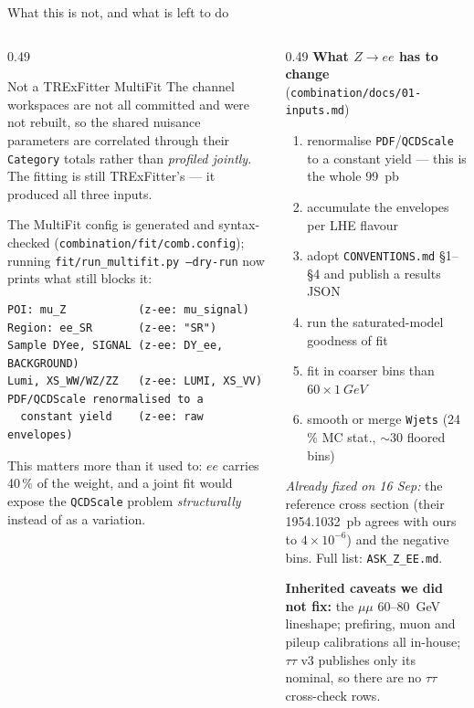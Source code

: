 \documentclass[aspectratio=169,9pt,t]{beamer}
\newcommand{\ee}{\ensuremath{ee}}
\newcommand{\src}[1]{{\scriptsize\color{gray}\texttt{#1}}}
\begin{document}
\begin{frame}[fragile]{What this is not, and what is left to do}
\begin{columns}[T]
\begin{column}{0.49\textwidth}\small
\begin{alertblock}{Not a TRExFitter MultiFit}
The channel workspaces are not all committed and were not rebuilt, so the shared nuisance
parameters are correlated through their \texttt{Category} totals rather than \emph{profiled
jointly}. The fitting is still TRExFitter's --- it produced all three inputs.
\end{alertblock}
The MultiFit config is generated and syntax-checked (\src{combination/fit/comb.config}); running
\src{fit/run\_multifit.py --dry-run} now prints what still blocks it:
{\scriptsize
\begin{verbatim}
POI: mu_Z           (z-ee: mu_signal)
Region: ee_SR       (z-ee: "SR")
Sample DYee, SIGNAL (z-ee: DY_ee, BACKGROUND)
Lumi, XS_WW/WZ/ZZ   (z-ee: LUMI, XS_VV)
PDF/QCDScale renormalised to a
  constant yield    (z-ee: raw envelopes)
\end{verbatim}}
\vspace{-2mm}
{\footnotesize This matters more than it used to: $\ee$ carries 40\,\% of the weight, and a joint
fit would expose the \texttt{QCDScale} problem \emph{structurally} instead of as a variation.}
\end{column}

\begin{column}{0.49\textwidth}\small
\textbf{What $Z\to ee$ has to change} (\src{combination/docs/01-inputs.md})
\begin{enumerate}\setlength\itemsep{0pt}
\item \alert{renormalise \texttt{PDF}/\texttt{QCDScale} to a constant yield} --- this is the whole
      \SI{99}{pb}
\item accumulate the envelopes per LHE flavour
\item adopt \texttt{CONVENTIONS.md} \S1--\S4 and publish a results JSON
\item run the saturated-model goodness of fit
\item fit in coarser bins than $60\times\SI{1}{GeV}$
\item smooth or merge \texttt{Wjets} (24\,\% MC stat., $\sim$30 floored bins)
\end{enumerate}
\emph{Already fixed on 16 Sep:} the reference cross section (their \SI{1954.1032}{pb} agrees with
ours to $4\times10^{-6}$) and the negative bins. Full list: \src{ASK\_Z\_EE.md}.

\medskip
\textbf{Inherited caveats we did not fix:} the $\mu\mu$ 60--\SI{80}{GeV} lineshape; prefiring,
muon and pileup calibrations all in-house; $\tau\tau$ v3 publishes only its nominal, so there are
no $\tau\tau$ cross-check rows.
\end{column}
\end{columns}
\end{frame}
\end{document}
